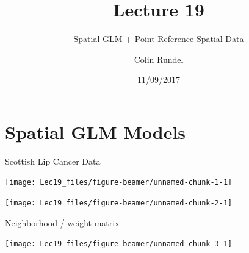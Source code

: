 \documentclass[11pt,ignorenonframetext,]{beamer}
\title{Lecture 19}
\subtitle{Spatial GLM + Point Reference Spatial Data}
\author{Colin Rundel}
\date{11/09/2017}
\begin{document}
\frame{\titlepage}

\hypertarget{spatial-glm-models}{%
\section{Spatial GLM Models}\label{spatial-glm-models}}

\begin{frame}{Scottish Lip Cancer Data}
\protect\hypertarget{scottish-lip-cancer-data}{}

\begin{center}\texttt{[image: Lec19\_files/figure-beamer/unnamed-chunk-1-1]} \end{center}

\end{frame}

\begin{frame}{}
\protect\hypertarget{section}{}

\begin{center}\texttt{[image: Lec19\_files/figure-beamer/unnamed-chunk-2-1]} \end{center}

\end{frame}

\begin{frame}{Neighborhood / weight matrix}
\protect\hypertarget{neighborhood-weight-matrix}{}

\vspace{-4mm}

\begin{center}\texttt{[image: Lec19\_files/figure-beamer/unnamed-chunk-3-1]} \end{center}

\end{frame}
\end{document}
